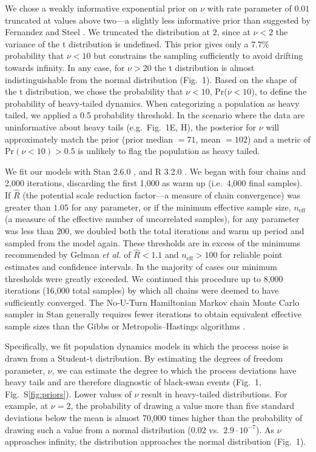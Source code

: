 We chose a weakly informative exponential prior on \(\nu\) with rate parameter
of \(0.01\) truncated at values above two---a slightly less informative prior
than suggested by Fernandez and Steel \citep{fernandez1998}. We truncated the
distribution at \(2\), since at \(\nu < 2\) the variance of the t distribution
is undefined. This prior gives only a \(7.7\)\% probability that \(\nu < 10\)
but constrains the sampling sufficiently to avoid drifting towards infinity. In
any case, for \(\nu > 20\) the t distribution is almost indistinguishable from
the normal distribution (Fig.~1). Based on the shape of the t distribution, we
chose the probability that \(\nu < 10\), Pr(\(\nu < 10\)), to define the
probability of heavy-tailed dynamics. When categorizing a population as heavy
tailed, we applied a 0.5 probability threshold. In the scenario where the data
are uninformative about heavy tails (e.g.~Fig.~1E, H), the posterior for
\(\nu\) will approximately match the prior (prior median \(= 71\), mean \(=
102\)) and a metric of Pr\((\nu < 10) > 0.5\) is unlikely to flag the
population as heavy tailed.

We fit our models with Stan 2.6.0 \citep{stan-manual2015, hoffman2014}, and R
3.2.0 \citep{r2015}. We began with four chains and 2,000 iterations, discarding
the first 1,000 as warm up (i.e.~4,000 final samples). If \(\hat{R}\) (the
potential scale reduction factor---a measure of chain convergence) was greater
than \(1.05\) for any parameter, or if the minimum effective sample size,
\(n_\mathrm{eff}\) (a measure of the effective number of uncorrelated samples),
for any parameter was less than \(200\), we doubled both the total iterations
and warm up period and sampled from the model again. These thresholds are in
excess of the minimums recommended by Gelman \emph{et al.} \citep{gelman2006a} of
\(\hat{R} < 1.1\) and \(n_\mathrm{eff} > 100\) for reliable point estimates and
confidence intervals. In the majority of cases our minimum thresholds were
greatly exceeded. We continued this procedure up to 8,000 iterations (16,000
total samples) by which all chains were deemed to have sufficiently converged.
The No-U-Turn Hamiltonian Markov chain Monte Carlo sampler in Stan generally
requires fewer iterations to obtain equivalent effective sample sizes than the
Gibbs or Metropolis--Hastings algorithms \citep{stan-manual2015}.

Specifically, we fit population dynamics models in which the process noise is
drawn from a Student-t distribution. By estimating the degrees of freedom
parameter, \(\nu\), we can estimate the degree to which the process deviations
have heavy tails and are therefore diagnostic of black-swan events (Fig.~1,
Fig.~S\ref{fig:priors}). Lower values of \(\nu\) result in heavy-tailed
distributions. For example, at \(\nu = 2\), the probability of drawing a value
more than five standard deviations below the mean is almost 70,000 times higher
than the probability of drawing such a value from a normal distribution
(\(0.02\) vs.\ \(2.9\cdot10^{-7}\)). As \(\nu\) approaches infinity, the
distribution approaches the normal distribution (Fig.~1).


